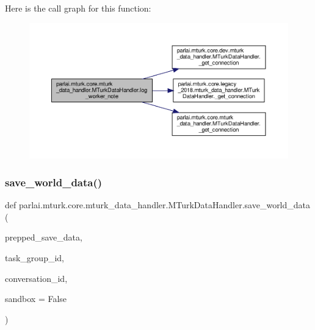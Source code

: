Here is the call graph for this function\+:
\nopagebreak
\begin{figure}[H]
\begin{center}
\leavevmode
\includegraphics[width=350pt]{classparlai_1_1mturk_1_1core_1_1mturk__data__handler_1_1MTurkDataHandler_a1cd561165b5924033cc44eaf69c3425c_cgraph}
\end{center}
\end{figure}
\mbox{\label{classparlai_1_1mturk_1_1core_1_1mturk__data__handler_1_1MTurkDataHandler_a500ef3c8e0c9b94d7759436da43a1a62}} 
\subsubsection{\texorpdfstring{save\+\_\+world\+\_\+data()}{save\_world\_data()}}
{\footnotesize\ttfamily def parlai.\+mturk.\+core.\+mturk\+\_\+data\+\_\+handler.\+M\+Turk\+Data\+Handler.\+save\+\_\+world\+\_\+data (\begin{DoxyParamCaption}\item[{}]{prepped\+\_\+save\+\_\+data,  }\item[{}]{task\+\_\+group\+\_\+id,  }\item[{}]{conversation\+\_\+id,  }\item[{}]{sandbox = {\ttfamily False} }\end{DoxyParamCaption})\hspace{0.3cm}{\ttfamily [static]}}



